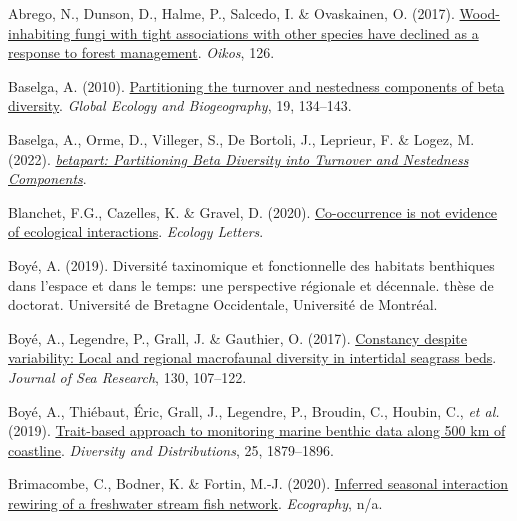 \documentclass[9pt,biorxiv,doublespacing,lineno,endfloat]{lapreprint}
\newlength{\cslhangindent}
\newlength{\cslentryspacingunit} %
\newenvironment{CSLReferences}[2] %
 {%
  \setlength{\parindent}{0pt}
  \ifodd #1
  \let\oldpar\par
  \def\par{\hangindent=\cslhangindent\oldpar}
  \fi
  \setlength{\parskip}{#2\cslentryspacingunit}
 }%
 {}
\begin{document}
\hypertarget{refs}{}
\begin{CSLReferences}{1}{0}
\leavevmode{}%
Abrego, N., Dunson, D., Halme, P., Salcedo, I. \& Ovaskainen, O. (2017).
\href{https://doi.org/10.1111/oik.03674}{Wood-inhabiting fungi with
tight associations with other species have declined as a response to
forest management}. \emph{Oikos}, 126.

\leavevmode{}%
Baselga, A. (2010).
\href{https://doi.org/10.1111/j.1466-8238.2009.00490.x}{Partitioning the
turnover and nestedness components of beta diversity}. \emph{Global
Ecology and Biogeography}, 19, 134--143.

\leavevmode{}%
Baselga, A., Orme, D., Villeger, S., De Bortoli, J., Leprieur, F. \&
Logez, M. (2022).
\emph{\href{https://CRAN.R-project.org/package=betapart}{betapart:
Partitioning Beta Diversity into Turnover and Nestedness Components}}.

\leavevmode{}%
Blanchet, F.G., Cazelles, K. \& Gravel, D. (2020).
\href{https://doi.org/10.1111/ele.13525}{Co-occurrence is not evidence
of ecological interactions}. \emph{Ecology Letters}.

\leavevmode{}%
Boyé, A. (2019). Diversité taxinomique et fonctionnelle des habitats
benthiques dans l'espace et dans le temps: une perspective régionale et
décennale. thèse de doctorat. Université de Bretagne Occidentale,
Université de Montréal.

\leavevmode{}%
Boyé, A., Legendre, P., Grall, J. \& Gauthier, O. (2017).
\href{https://doi.org/10.1016/j.seares.2017.06.004}{Constancy despite
variability: Local and regional macrofaunal diversity in intertidal
seagrass beds}. \emph{Journal of Sea Research}, 130, 107--122.

\leavevmode{}%
Boyé, A., Thiébaut, Éric, Grall, J., Legendre, P., Broudin, C., Houbin,
C., \emph{et al.} (2019).
\href{https://doi.org/10.1111/ddi.12987}{Trait-based approach to
monitoring marine benthic data along 500 km of coastline}.
\emph{Diversity and Distributions}, 25, 1879--1896.

\leavevmode{}%
Brimacombe, C., Bodner, K. \& Fortin, M.-J. (2020).
\href{https://doi.org/10.1111/ecog.05452}{Inferred seasonal interaction
rewiring of a freshwater stream fish network}. \emph{Ecography}, n/a.


\end{CSLReferences}
\end{document}
